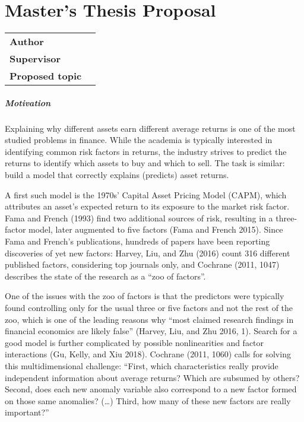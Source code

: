 \chapter*{Master's Thesis Proposal}

\begin{tabular}{lp{10.1cm}}
		\hline
		\textbf{Author} &\href{mailto:\Email}{\AutorDP}\\
		\textbf{Supervisor} &\href{mailto:\EmailSup}{\Supervisor}\\
		\textbf{Proposed topic} &\Bookname\\
		\hline
\end{tabular}

\bigskip

\small
\paragraph{Motivation}

Explaining why different assets earn different average returns is one of the most studied problems in finance. While the academia is typically interested in identifying common risk factors in returns, the industry strives to predict the returns to identify which assets to buy and which to sell. The task is similar: build a model that correctly explains (predicts) asset returns.   

A first such model is the 1970s’ Capital Asset Pricing Model (CAPM), which attributes an asset’s expected return to its exposure to the market risk factor. Fama and French (1993) find two additional sources of risk, resulting in a three-factor model, later augmented to five factors (Fama and French 2015). Since Fama and French’s publications, hundreds of papers have been reporting discoveries of yet new factors: Harvey, Liu, and Zhu (2016) count 316 different published factors, considering top journals only, and Cochrane (2011, 1047) describes the state of the research as a “zoo of factors”. 

One of the issues with the zoo of factors is that the predictors were typically found controlling only for the usual three or five factors and not the rest of the zoo, which is one of the leading reasons why “most claimed research findings in financial economics are likely false” (Harvey, Liu, and Zhu 2016, 1). Search for a good model is further complicated by possible nonlinearities and factor interactions (Gu, Kelly, and Xiu 2018). Cochrane (2011, 1060) calls for solving this multidimensional challenge: “First, which characteristics really provide independent information about average returns? Which are subsumed by others? Second, does each new anomaly variable also correspond to a new factor formed on those same anomalies? (…) Third, how many of these new factors are really important?”  


